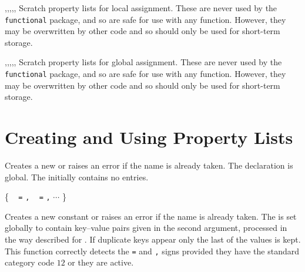 \documentclass[oneside]{book}
\begin{document}
\begin{variable}{\lTmpaProp,\lTmpbProp,\lTmpcProp,\lTmpiProp,\lTmpjProp,\lTmpkProp}
Scratch property lists for local assignment. These are never used by
the \verb!functional! package, and so are safe for use with any
function. However, they may be overwritten by other
code and so should only be used for short-term storage.
\end{variable}

\begin{variable}{\gTmpaProp,\gTmpbProp,\gTmpcProp,\gTmpiProp,\gTmpjProp,\gTmpkProp}
Scratch property lists for global assignment. These are never used by
the \verb!functional! package, and so are safe for use with any
function. However, they may be overwritten by other
code and so should only be used for short-term storage.
\end{variable}

\section{Creating and Using Property Lists}

\begin{function}{\PropNew}
\begin{syntax}
 
\end{syntax}
Creates a new  or raises an error if the name is
already taken. The declaration is global. The 
initially contains no entries.
\begin{codehigh}
\PropNew \lFooSomeProp
\end{codehigh}
\end{function}

\begin{function}{\PropConstFromKeyval}
\begin{syntax}
 
\{
~  \verb|=|  \verb|,|
~  \verb|=|  \verb|,| $\cdots$
\}
\end{syntax}
Creates a new constant  or raises an error if the
name is already taken. The  is set globally to
contain key--value pairs given in the second argument, processed in
the way described for .  If duplicate
keys appear only the last of the values is kept.
This function correctly detects the \verb|=| and \verb|,| signs provided they
have the standard category code $12$ or they are active.
\begin{codehigh}
\PropConstFromKeyval {}
\end{codehigh}
\end{function}
\end{document}

